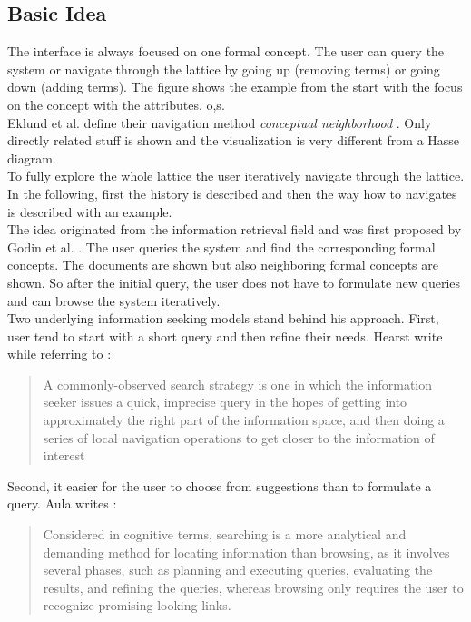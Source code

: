 \documentclass[11pt]{report}
\begin{document}
\subsection{Basic Idea}
The interface is always focused on one formal concept. The user can query the system or navigate through the lattice by going up (removing terms) or going down (adding terms). The figure shows the example from the start with the focus on the concept with the attributes. {o,s}. \\ 


Eklund et al. define their navigation method \textit{conceptual neighborhood} \cite{Eklund2009,Eklund2012}. Only directly related stuff is shown and the visualization is very different from a Hasse diagram. \\

To fully explore the whole lattice the user iteratively navigate through the lattice. In the following, first the history is described and then the way how to navigates is described with an example. \\

The idea originated from the information retrieval field and was first proposed by Godin et al. \cite{Godin1989}. The user queries the system and find the corresponding formal concepts. The documents are shown but also neighboring formal concepts are shown. So after the initial query, the user does not have to formulate new queries and can browse the system iteratively. \\

Two underlying information seeking models stand behind his approach. First, user tend to start with a short query and then refine their needs. Hearst \cite{Hearst2009} write  while referring to \cite{Marchionini2006,Bates1990}:
\begin{quote}
	A commonly-observed search strategy is one in which the information seeker issues a quick, imprecise query in the hopes of getting into approximately the right part of the information space, and then doing a series of local navigation operations to get closer to the information of interest
\end{quote}

Second, it easier for the user to choose from suggestions than to formulate a query. Aula writes \cite{Aula2005}:
\begin{quote}
	Considered in cognitive terms, searching is a more analytical and demanding method for locating information than browsing, as it involves several phases, such as planning and executing queries, evaluating the results, and refining the queries, whereas browsing only requires the user to recognize promising-looking links.
\end{quote}
\end{document}
